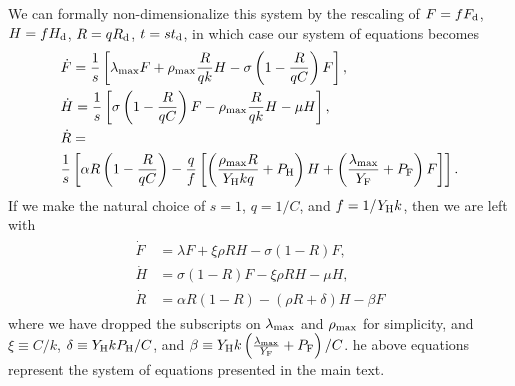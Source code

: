 \documentclass[twocolumn,preprintnumbers,amsmath,amssymb,superscriptaddress]{revtex4}
\begin{document}
{We can formally non-dimensionalize this system by the rescaling of $F=fF_{\rm d}$, $H=fH_{\rm d}$, $R=qR_{\rm d}$, $t=st_{\rm d}$, in which case our system of equations becomes
\begin{align}
\begin{split}
&\dot{F} = \frac{1}{s}\left[\lambda_{\rm \text{max}} F + \rho_{\rm \text{max}}\frac{R}{qk}H - \sigma \left(1-\frac{R}{qC}\right)F\right],  \\
&\dot{H} = \frac{1}{s}\left[\sigma \left(1-\frac{R}{qC}\right)F - \rho_{\rm \text{max}}\frac{R}{qk} H - \mu H\right],  \\
& \dot{R} = \\
&\frac{1}{s}\left[\alpha R\left(1-\frac{R}{qC}\right) -\frac{q}{f}\left[\left(\frac{\rho_{\rm \text{max}}R}{Y_{\rm H}kq}+P_{\rm H}\right)H+\left(\frac{\lambda_{\rm \text{max}}}{Y_{\rm F}}+P_{\rm F}\right)F\right]\right].
\end{split}
\end{align}
If we make the natural choice of $s=1$, $q=1/C$, and $f=1/Y_{\rm H}k$, then we are left with
\begin{align}
\begin{split}
\dot{F} &= \lambda F + \xi \rho RH - \sigma \left(1-R\right)F,  \\
\dot{H} &= \sigma \left(1-R\right)F - \xi \rho RH - \mu H,  \\
\dot{R} &= \alpha R\left(1-R\right) -\left(\rho R+\delta\right)H-\beta F
\label{reduceddynamics}
\end{split}
\end{align}
where we have dropped the subscripts on $\lambda_{\rm \text{max}}$ and $\rho_{\rm \text{max}}$ for simplicity, and $\xi\equiv C/k$, $\delta\equiv Y_{\rm H}kP_{\rm H}/C$, and $\beta\equiv Y_{\rm H}k\left(\frac{\lambda_{\rm \text{max}}}{Y_{\rm F}}+P_{\rm F}\right)/C$. 
he above equations represent the system of equations presented in the main text.\\



}
\end{document}
